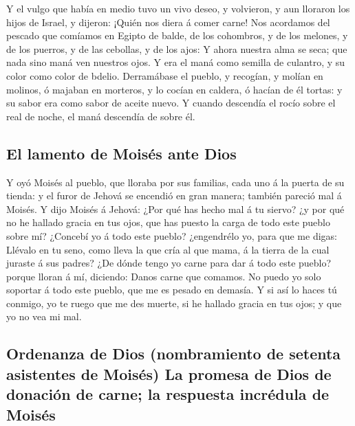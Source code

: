  Y el vulgo que había en medio tuvo un vivo deseo, y
volvieron, y aun lloraron los hijos de Israel, y dijeron: ¡Quién nos
diera á comer carne!  Nos acordamos del pescado que
comíamos en Egipto de balde, de los cohombros, y de los melones, y de
los puerros, y de las cebollas, y de los ajos:  Y ahora
nuestra alma se seca; que nada sino maná ven nuestros ojos.
 Y era el maná como semilla de culantro, y su color como
color de bdelio.  Derramábase el pueblo, y recogían, y
molían en molinos, ó majaban en morteros, y lo cocían en caldera, ó
hacían de él tortas: y su sabor era como sabor de aceite nuevo.
 Y cuando descendía el rocío sobre el real de noche, el
maná descendía de sobre él.

\hypertarget{el-lamento-de-moisuxe9s-ante-dios}{%
\subsection{El lamento de Moisés ante
Dios}\label{el-lamento-de-moisuxe9s-ante-dios}}

 Y oyó Moisés al pueblo, que lloraba por sus familias,
cada uno á la puerta de su tienda: y el furor de Jehová se encendió en
gran manera; también pareció mal á Moisés.  Y dijo Moisés
á Jehová: ¿Por qué has hecho mal á tu siervo? ¿y por qué no he hallado
gracia en tus ojos, que has puesto la carga de todo este pueblo sobre
mí?  ¿Concebí yo á todo este pueblo? ¿engendrélo yo, para
que me digas: Llévalo en tu seno, como lleva la que cría al que mama, á
la tierra de la cual juraste á sus padres?  ¿De dónde
tengo yo carne para dar á todo este pueblo? porque lloran á mí,
diciendo: Danos carne que comamos.  No puedo yo solo
soportar á todo este pueblo, que me es pesado en demasía.
 Y si así lo haces tú conmigo, yo te ruego que me des
muerte, si he hallado gracia en tus ojos; y que yo no vea mi mal.

\hypertarget{ordenanza-de-dios-nombramiento-de-setenta-asistentes-de-moisuxe9s-la-promesa-de-dios-de-donaciuxf3n-de-carne-la-respuesta-incruxe9dula-de-moisuxe9s}{%
\subsection{Ordenanza de Dios (nombramiento de setenta asistentes de
Moisés) La promesa de Dios de donación de carne; la respuesta incrédula
de
Moisés}\label{ordenanza-de-dios-nombramiento-de-setenta-asistentes-de-moisuxe9s-la-promesa-de-dios-de-donaciuxf3n-de-carne-la-respuesta-incruxe9dula-de-moisuxe9s}}


